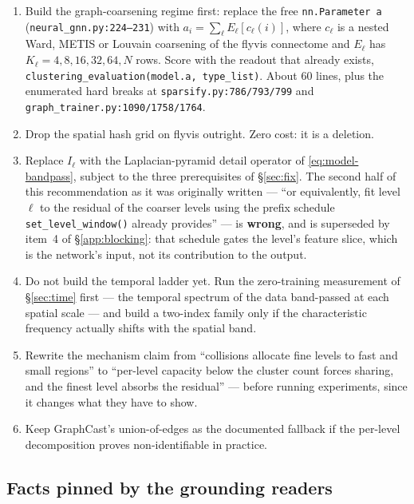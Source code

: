 \documentclass[11pt,a4paper]{article}
\begin{document}
\begin{enumerate}[leftmargin=1.6em,itemsep=3pt]
\item Build the graph-coarsening regime first: replace the free \texttt{nn.Parameter a}
(\texttt{neural\_gnn.py:224--231}) with $a_i = \sum_\ell E_\ell[c_\ell(i)]$, where $c_\ell$
is a nested Ward, METIS or Louvain coarsening of the flyvis connectome and $E_\ell$ has
$K_\ell = 4, 8, 16, 32, 64, N$ rows. Score with the readout that already exists,
\texttt{clustering\_evaluation(model.a, type\_list)}. About $60$ lines, plus the enumerated
hard breaks at \texttt{sparsify.py:786/793/799} and
\texttt{graph\_trainer.py:1090/1758/1764}.
\item Drop the spatial hash grid on flyvis outright. Zero cost: it is a deletion.
\item Replace $I_\ell$ with the Laplacian-pyramid detail operator of
\eqref{eq:model-bandpass}, subject to the three prerequisites of \S\ref{sec:fix}. The second
half of this recommendation as it was originally written --- ``or equivalently, fit level
$\ell$ to the residual of the coarser levels using the prefix schedule
\texttt{set\_level\_window()} already provides'' --- is \textbf{wrong}, and is superseded by
item~4 of \S\ref{app:blocking}: that schedule gates the level's feature slice, which is the
network's input, not its contribution to the output.

\item Do not build the temporal ladder yet. Run the zero-training measurement of
\S\ref{sec:time} first --- the temporal spectrum of the data band-passed at each spatial
scale --- and build a two-index family only if the characteristic frequency actually shifts
with the spatial band.
\item Rewrite the mechanism claim from ``collisions allocate fine levels to fast and small
regions'' to ``per-level capacity below the cluster count forces sharing, and the finest
level absorbs the residual'' --- before running experiments, since it changes what they have
to show.
\item Keep GraphCast's union-of-edges as the documented fallback if the per-level
decomposition proves non-identifiable in practice.
\end{enumerate}

\subsection{Facts pinned by the grounding readers}
\end{document}
